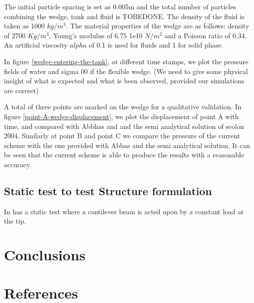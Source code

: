\documentclass[preprint,12pt]{elsarticle}
\begin{document}
The initial particle spacing is set as 0.005m and the total number of
particles combining the wedge, tank and fluid is TOBEDONE. The density of the
fluid is taken as 1000 $kg/m^3$. The material properties of the wedge are as
follows: density of 2700 $Kg/m^3$, Young's modulus of 6.75 1e10 $N/m^2$ and a
Poisson ratio of 0.34. An artificial viscosity $alpha$ of 0.1 is used for
fluids and 1 for solid phase.

In figure \ref{wedge-entering-the-tank}, at different time stamps, we plot the
pressure fields of water and sigma 00 if the flexible wedge. (We need to give
some physical insight of what is expected and what is been observed, provided
our simulations are correct)



A total of three points are marked on the wedge for a qualitative validation.
In figure \ref{point-A-wedge-displacement}, we plot the displacement of point
A with time, and compared with Abbhas and and the semi analytical solution of
scolon 2004. Similarly at point B and point C we compare the pressure of the
current scheme with the one provided with Abbas and the semi analytical
solution. It can be seen that the current scheme is able to produce the
results with a reasonable accuracy.



\subsection{Static test to test Structure formulation}
\label{sec:static-test}

In \citet{hwang2015development} has a static test where a cantilever beam is
acted upon by a constant load at the tip.



\section{Conclusions}
\label{sec:conclusions}


\section*{References}


\end{document}
